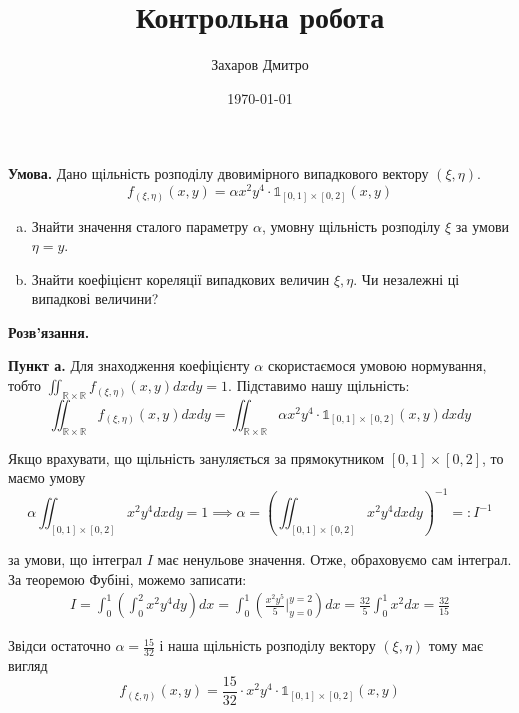 \documentclass[oneside,solution]{karazin-prob-theory-assign}
\title{Контрольна робота}
\author{Захаров Дмитро}
\date{\today}
\begin{document}
\maketitle



\hspace{20px}\textbf{Умова.} Дано щільність розподілу двовимірного випадкового вектору $(\xi,\eta)$.
\begin{equation*}
    f_{(\xi,\eta)}(x,y) = \alpha x^2y^4 \cdot \mathds{1}_{[0,1] \times [0,2]}(x,y)
\end{equation*}

\begin{enumerate}[(a)]
    \item Знайти значення сталого параметру $\alpha$, умовну щільність розподілу $\xi$ за умови $\eta=y$.
    \item Знайти коефіцієнт кореляції випадкових величин $\xi,\eta$. Чи незалежні ці випадкові величини?
\end{enumerate}

\textbf{Розв'язання.} 

\textbf{Пункт а.} Для знаходження коефіцієнту $\alpha$ скористаємося умовою нормування, тобто $\iint_{\mathbb{R} \times \mathbb{R}}f_{(\xi,\eta)}(x,y)dxdy=1$. Підставимо нашу щільність:
\begin{equation}
    \iint_{\mathbb{R} \times \mathbb{R}}f_{(\xi,\eta)}(x,y)dxdy = \iint_{\mathbb{R} \times \mathbb{R}} \alpha x^2y^4 \cdot \mathds{1}_{[0,1] \times [0,2]}(x,y)dxdy
\end{equation}

Якщо врахувати, що щільність зануляється за прямокутником $[0,1]\times [0,2]$, то маємо умову
\begin{equation}
    \alpha \iint_{[0,1] \times [0,2]} x^2y^4dxdy = 1 \implies \alpha = \left(\iint_{[0,1] \times [0,2]} x^2y^4dxdy\right)^{-1} =: I^{-1}
\end{equation}

за умови, що інтеграл $I$ має ненульове значення. Отже, обраховуємо сам інтеграл. За теоремою Фубіні, можемо записати:
\begin{gather}
    I = \int_0^1 \left(\int_0^2 x^2y^4dy\right)dx = \int_0^1 \left(\frac{x^2y^5}{5}\Big|_{y=0}^{y=2}\right)dx = \frac{32}{5}\int_0^1 x^2dx = \frac{32}{15}
\end{gather}

Звідси остаточно $\boxed{\alpha = \frac{15}{32}}$ і наша щільність розподілу вектору $(\xi,\eta)$ тому має вигляд
\begin{equation}
    f_{(\xi,\eta)}(x,y) = \frac{15}{32} \cdot x^2y^4 \cdot \mathds{1}_{[0,1]\times [0,2]}(x,y)
\end{equation}
\end{document}
